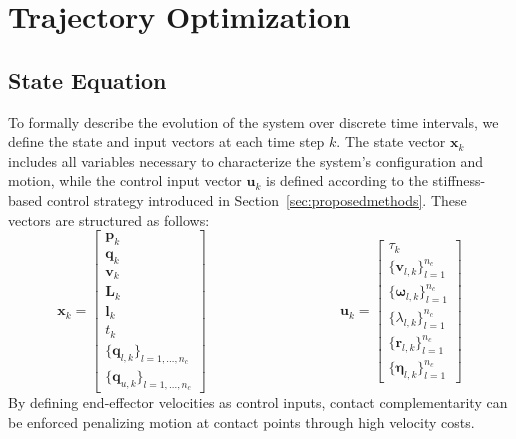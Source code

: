 \documentclass[main.tex]{subfiles}
\begin{document}
\begin{sloppypar}
\section{Trajectory Optimization}
\label{sec:formulation}
\subsection{State Equation}
To formally describe the evolution of the system over discrete time intervals, we define the state and input vectors at each time step \( k \). The state vector \( \mathbf{x}_k \) includes all variables necessary to characterize the system’s configuration and motion, while the control input vector \( \mathbf{u}_k \) is defined according to the stiffness-based control strategy introduced in Section~\ref{sec:proposedmethods}. These vectors are structured as follows:
\begin{equation}
\label{eq:state_input}
\mathbf{x}_k =
\begin{bmatrix}
\mathbf{p}_k \\
\mathbf{q}_k \\
\mathbf{v}_k \\
\mathbf{L}_k \\
\mathbf{l}_k \\
t_k \\
\{\mathbf{q}_{l,k}\}_{l=1,\ldots,n_c} \\
\{\mathbf{q}_{u,k}\}_{l=1,\ldots,n_c}
\end{bmatrix}
\hspace{4cm}
\mathbf{u}_k =
\begin{bmatrix}
\tau_k \\
\{\mathbf{v}_{l,k}\}_{l=1}^{n_c} \\
\{\boldsymbol{\omega}_{l,k}\}_{l=1}^{n_c} \\
\{\lambda_{l,k}\}_{l=1}^{n_c} \\
\{\mathbf{r}_{l,k}\}_{l=1}^{n_c} \\
\{\boldsymbol{\eta}_{l,k}\}_{l=1}^{n_c}
\end{bmatrix}
\end{equation}
By defining end-effector velocities as control inputs, contact complementarity can be enforced penalizing motion at contact points through high velocity costs.

\end{sloppypar}
\end{document}
